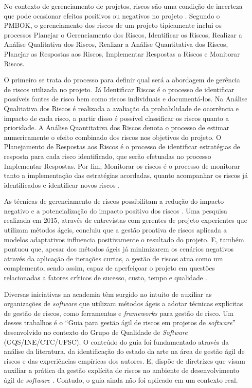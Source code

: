 \documentclass[
    12pt,       %
    openright,      %
    twoside,      %
    a4paper,      %
    english,      %
    french,       %
    spanish,      %
    brazil,       %
    ]{abntex2}
\begin{document}
No contexto de gerenciamento de projetos, riscos são uma condição de incerteza que pode ocasionar efeitos positivos ou negativos no projeto \cite{PMBOK:2017}. Segundo o PMBOK, o gerenciamento dos riscos de um projeto tipicamente inclui os processos Planejar o Gerenciamento dos Riscos, Identificar os Riscos, Realizar a Análise Qualitativa dos Riscos, Realizar a Análise Quantitativa dos Riscos, Planejar as Respostas aos Riscos, Implementar Respostas a Riscos e Monitorar Riscos. 

O primeiro se trata do processo para definir qual será a abordagem de gerência de riscos utilizada no projeto. Já Identificar Riscos é o processo de identificar possíveis fontes de risco bem como riscos individuais e documentá-los. Na Análise Qualitativa dos Riscos é realizada a avaliação da probabilidade de ocorrência e impacto de cada risco, a partir disso é possível classificar os riscos quanto a prioridade. A Análise Quantitativa dos Riscos denota o processo de estimar numericamente o efeito combinado dos riscos nos objetivos do projeto. O Planejamento de Respostas aos Riscos é o processo de identificar estratégias de resposta para cada risco identificado, que serão efetuadas no processo Implementar Respostas. Por fim, Monitorar os riscos é o processo de monitorar tanto a implementação das estratégias acordadas, quanto acompanhar os riscos já identificados e identificar novos riscos \cite{PMBOK:2017}.

As técnicas de gerenciamento de riscos possibilitam a redução do impacto negativo e a potencialização do impacto positivo dos riscos \cite{Milare:2019}. Uma pesquisa realizada em 2015, através de entrevistas com gerentes de projeto experientes que utilizam métodos ágeis, concluiu que a gestão proativa de riscos aplicada a modelos adaptativos influencia positivamente o resultado do projeto. E, também pontuou que, apesar dos métodos ágeis já minimizarem os cenários negativos através da aplicação de iterações curtas, a gestão de riscos atua como um complemento, sendo assim, capaz de aperfeiçoar o projeto em questões relacionadas a fatores críticos de sucesso, custo, tempo e qualidade \cite{Gold:2015}.

Diversas iniciativas na academia têm surgido no intuito de auxiliar as organizações de \textit{software} que utilizam métodos ágeis a adotar técnicas explícitas de gestão de riscos, como ferramentas \cite{TAVARES:2020} e \textit{frameworks} \cite{GANDOMANI:2020} para gestão de risco.  Um desses trabalhos é o “Guia para gestão ágil de riscos em projetos de \textit{software}” desenvolvido no contexto do Grupo de Qualidade de \textit{Software} (GQS/INE/CTC/UFSC). O conteúdo do guia foi fundamentado através da análise da literatura, da identificação do estado da arte na área de gestão ágil de riscos e das experiências empíricas dos autores. E, dispõe de diretrizes que visam auxiliar a prática da gestão explícita de riscos no ambiente de desenvolvimento ágil de \textit{software} \cite{Vieira:2020}. Contudo, o guia ainda não foi aplicado em um contexto real. 
\end{document}
